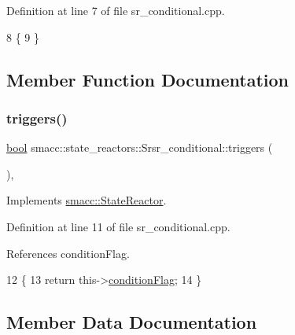 Definition at line 7 of file sr\+\_\+conditional.\+cpp.


\begin{DoxyCode}
8 \{
9 \}
\end{DoxyCode}


\subsection{Member Function Documentation}
\mbox{\label{classsmacc_1_1state__reactors_1_1Srsr__conditional_aa95877afb569902015924e5e7d1da35a}} 
\subsubsection{\texorpdfstring{triggers()}{triggers()}}
{\footnotesize\ttfamily \hyperlink{classbool}{bool} smacc\+::state\+\_\+reactors\+::\+Srsr\+\_\+conditional\+::triggers (\begin{DoxyParamCaption}{ }\end{DoxyParamCaption})\hspace{0.3cm}{\ttfamily [override]}, {\ttfamily [virtual]}}



Implements \hyperlink{classsmacc_1_1StateReactor_a445bc3c90980d75d7d815b85cfb68b21}{smacc\+::\+State\+Reactor}.



Definition at line 11 of file sr\+\_\+conditional.\+cpp.



References condition\+Flag.


\begin{DoxyCode}
12 \{
13     \textcolor{keywordflow}{return} this->\hyperlink{classsmacc_1_1state__reactors_1_1Srsr__conditional_a2c1c6a4acf1429526fe8c84e66479fbc}{conditionFlag};
14 \}
\end{DoxyCode}


\subsection{Member Data Documentation}
\mbox{\label{classsmacc_1_1state__reactors_1_1Srsr__conditional_a2c1c6a4acf1429526fe8c84e66479fbc}} 
